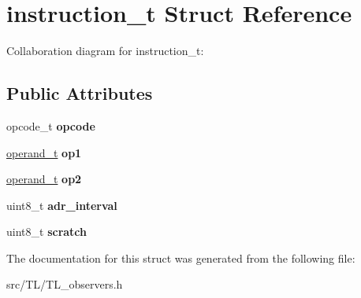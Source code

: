 \hypertarget{structinstruction__t}{}\section{instruction\+\_\+t Struct Reference}
\label{structinstruction__t}


Collaboration diagram for instruction\+\_\+t\+:
\subsection*{Public Attributes}
\begin{DoxyCompactItemize}
\item 
\mbox{\label{structinstruction__t_a281cfabd9c19f07edf2473072db66a62}} 
opcode\+\_\+t {\bfseries opcode}
\item 
\mbox{\label{structinstruction__t_ae0e32163a22ff700a2cc9b4415d1d641}} 
\hyperlink{structoperand__t}{operand\+\_\+t} {\bfseries op1}
\item 
\mbox{\label{structinstruction__t_ab010fe291935c7a9b165d09a148feeef}} 
\hyperlink{structoperand__t}{operand\+\_\+t} {\bfseries op2}
\item 
\mbox{\label{structinstruction__t_a580bd7eeeffe9cb800a8a2fde49f8c4c}} 
uint8\+\_\+t {\bfseries adr\+\_\+interval}
\item 
\mbox{\label{structinstruction__t_a4336d1b8c6e33fd8b09a3cb76c6b979e}} 
uint8\+\_\+t {\bfseries scratch}
\end{DoxyCompactItemize}


The documentation for this struct was generated from the following file\+:\begin{DoxyCompactItemize}
\item 
src/\+T\+L/T\+L\+\_\+observers.\+h\end{DoxyCompactItemize}
